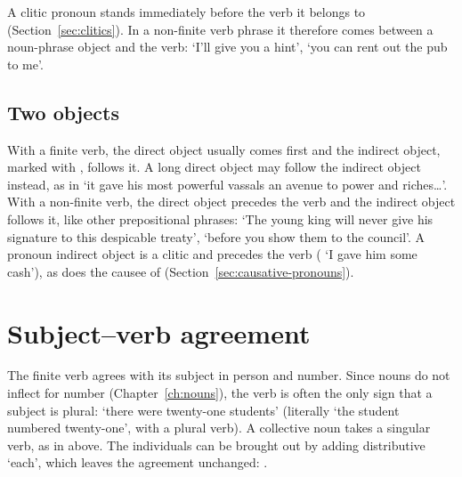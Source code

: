 A clitic pronoun stands immediately before the verb it belongs to (Section~\ref{sec:clitics}). In a non-finite verb phrase it therefore comes between a noun-phrase object and the verb:  `I'll give you a hint',  `you can rent out the pub to me'.

\subsection{Two objects}
With a finite verb, the direct object usually comes first and the indirect object, marked with , follows it. A long direct object may follow the indirect object instead, as in  `it gave his most powerful vassals an avenue to power and riches\ldots'.
With a non-finite verb, the direct object precedes the verb and the indirect object follows it, like other prepositional phrases:  `The young king will never give his signature to this despicable treaty',  `before you show them to the council'. A pronoun indirect object is a clitic and precedes the verb ( `I gave him some cash'), as does the causee of  (Section~\ref{sec:causative-pronouns}).

\section{Subject--verb agreement}\label{sec:agreement}
The finite verb agrees with its subject in person and number. Since nouns do not inflect for number (Chapter~\ref{ch:nouns}), the verb is often the only sign that a subject is plural:  `there were twenty-one students' (literally `the student numbered twenty-one', with a plural verb).
A collective noun takes a singular verb, as in  above. The individuals can be brought out by adding distributive  `each', which leaves the agreement unchanged: .

